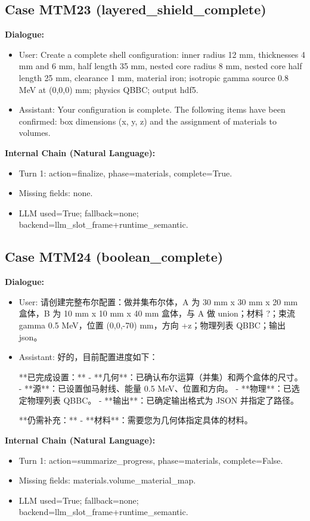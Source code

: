 \documentclass[11pt]{ctexart}
\begin{document}
\subsection{Case MTM23 (layered\_shield\_complete)}
\textbf{Dialogue:}
\begin{itemize}
\item User: Create a complete shell configuration: inner radius 12 mm, thicknesses 4 mm and 6 mm, half length 35 mm, nested core radius 8 mm, nested core half length 25 mm, clearance 1 mm, material iron; isotropic gamma source 0.8 MeV at (0,0,0) mm; physics QBBC; output hdf5.
\item Assistant: Your configuration is complete. The following items have been confirmed: box dimensions (x, y, z) and the assignment of materials to volumes.
\end{itemize}
\textbf{Internal Chain (Natural Language):}
\begin{itemize}
\item Turn 1: action=finalize, phase=materials, complete=True.
\item Missing fields: none.
\item LLM used=True; fallback=none; backend=llm\_slot\_frame+runtime\_semantic.
\end{itemize}
\subsection{Case MTM24 (boolean\_complete)}
\textbf{Dialogue:}
\begin{itemize}
\item User: 请创建完整布尔配置：做并集布尔体，A 为 30 mm x 30 mm x 20 mm 盒体，B 为 10 mm x 10 mm x 40 mm 盒体，与 A 做 union；材料 ?；束流 gamma 0.5 MeV，位置 (0,0,-70) mm，方向 +z；物理列表 QBBC；输出 json。
\item Assistant: 好的，目前配置进度如下：

**已完成设置：**
- **几何**：已确认布尔运算（并集）和两个盒体的尺寸。
- **源**：已设置伽马射线、能量 0.5 MeV、位置和方向。
- **物理**：已选定物理列表 QBBC。
- **输出**：已确定输出格式为 JSON 并指定了路径。

**仍需补充：**
- **材料**：需要您为几何体指定具体的材料。
\end{itemize}
\textbf{Internal Chain (Natural Language):}
\begin{itemize}
\item Turn 1: action=summarize\_progress, phase=materials, complete=False.
\item Missing fields: materials.volume\_material\_map.
\item LLM used=True; fallback=none; backend=llm\_slot\_frame+runtime\_semantic.
\end{itemize}
\end{document}
